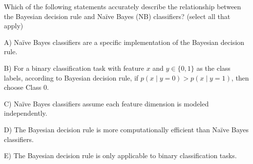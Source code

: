 Which of the following statements accurately describe the relationship between the Bayesian decision rule and Naïve Bayes (NB) classifiers? (select all that apply)


A) Naïve Bayes classifiers are a specific implementation of the Bayesian decision rule.


B) For a binary classification task with feature \(x\) and \(y\in\{0,1\}\) as the class labels, according to Bayesian decision rule, if \(p(x\mid y=0)>p(x\mid y=1)\), then choose Class 0.


C) Naïve Bayes classifiers assume each feature dimension is modeled independently.


D) The Bayesian decision rule is more computationally efficient than Naïve Bayes classifiers.


E) The Bayesian decision rule is only applicable to binary classification tasks.
